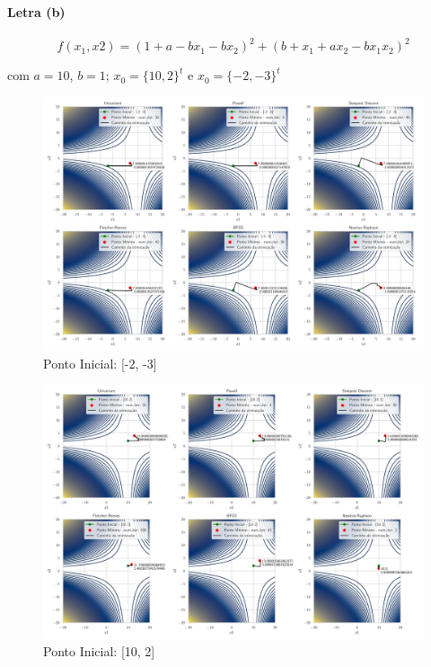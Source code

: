 \documentclass[12pt]{article}
\begin{document}
\paragraph*{Letra (b)}

\begin{equation}
  f(x_{1}, x{2}) = (1+a-bx_{1}-bx_{2})^{2}+(b+x_{1}+ax_{2}-bx_{1}x_{2})^{2}
\end{equation}

\noindent com $a=10$, $b=1$;  $x_{0}=\{10,2\}^{t}$ e $x_{0}=\{-2,-3\}^{t}$

\begin{figure}[H]
  \centering
  \caption{Ponto Inicial: [-2, -3]}
  \includegraphics[scale=0.4]{img/questao_1b_[-2 -3].pdf}
\end{figure}

\begin{figure}[H]
  \centering
  \caption{Ponto Inicial: [10, 2]}
  \includegraphics[scale=0.4]{img/questao_1b_2.pdf}
\end{figure}
\end{document}
